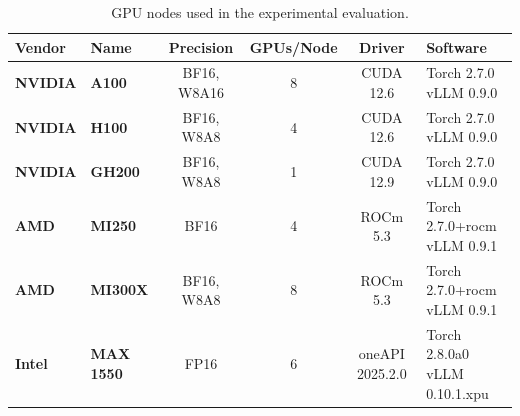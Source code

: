 \begin{table}[h!]
\centering
\footnotesize
\caption{GPU nodes used in the experimental evaluation.}
\label{tab:nodes}

\begin{tabularx}{\textwidth}{l l c c c X}
\toprule
\textbf{Vendor} & \textbf{Name} & \textbf{Precision} & \textbf{GPUs/Node} & \textbf{Driver} & \textbf{Software} \\
\midrule

\textbf{NVIDIA} & \textbf{A100}  & BF16, W8A16 & 8  & CUDA 12.6 & \makecell[l]{Torch 2.7.0 \\ vLLM 0.9.0} \\

\textbf{NVIDIA} & \textbf{H100}  & BF16, W8A8  & 4  & CUDA 12.6 & \makecell[l]{Torch 2.7.0 \\ vLLM 0.9.0} \\

\textbf{NVIDIA} & \textbf{GH200} & BF16, W8A8  & 1  & CUDA 12.9 & \makecell[l]{Torch 2.7.0 \\ vLLM 0.9.0} \\

\midrule

\textbf{AMD} & \textbf{MI250}  & BF16        & 4 & ROCm 5.3 & \makecell[l]{Torch 2.7.0+rocm \\ vLLM 0.9.1} \\

\textbf{AMD} & \textbf{MI300X} & BF16, W8A8  & 8 & ROCm 5.3 & \makecell[l]{Torch 2.7.0+rocm \\ vLLM 0.9.1} \\

\midrule

\textbf{Intel} & \textbf{MAX 1550} & FP16 & 6 & oneAPI 2025.2.0 & \makecell[l]{Torch 2.8.0a0 \\ vLLM 0.10.1.xpu} \\

\bottomrule
\end{tabularx}
\end{table}


